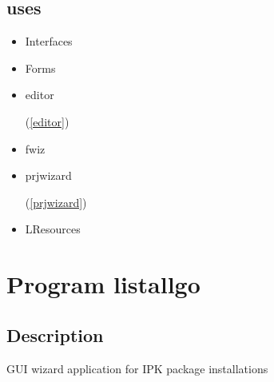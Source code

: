 \documentclass{report}
\begin{document}
\section{uses}
\begin{itemize}
\item \begin{ttfamily}Interfaces\end{ttfamily}\item \begin{ttfamily}Forms\end{ttfamily}\item \begin{ttfamily}editor\end{ttfamily}(\ref{editor})\item \begin{ttfamily}fwiz\end{ttfamily}\item \begin{ttfamily}prjwizard\end{ttfamily}(\ref{prjwizard})\item \begin{ttfamily}LResources\end{ttfamily}\end{itemize}
\chapter{Program listallgo}
\label{listallgo}
\section{Description}
GUI wizard application for IPK package installations
\end{document}
